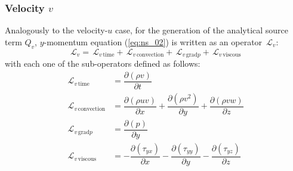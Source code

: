\documentclass[10pt]{article}
\newcommand{\Diff}[2] {\dfrac{\partial( #1)}{\partial #2}}
\newcommand{\Lo}{\,\mathcal{L}}
\newcommand{\convection}{\text{convection}}
\newcommand{\gradp}{\text{grad}p}
\newcommand{\viscous}{\text{viscous}}
\begin{document}
\subsubsection{Velocity $v$}
Analogously to the velocity-$u$ case, for the generation of the analytical source term $Q_v$, $y$-momentum equation (\ref{eq:ns_02}) is written as an operator $\Lo_v$:
 $$\Lo_v = \Lo_{v \, \text{time}}+\Lo_{v \, \convection}+\Lo_{v \, \gradp }+\Lo_{v \, \viscous }$$
with each one of the sub-operators defined as follows:
\begin{equation*}
 \begin{split}
\Lo_{v \, \text{time}}&= \Diff{\rho v}{t} \\
\Lo_{v \, \convection}&= \Diff{\rho uv }{x}+\Diff{\rho v^2}{y} +\Diff{\rho vw}{z}\\
\Lo_{v \, \gradp }&= \Diff{p}{y}\\
\Lo_{v \, \viscous }&= -\Diff{\tau_{yx}}{x}-\Diff{\tau_{yy}}{y}-\Diff{\tau_{yz}}{z}
 \end{split}
\end{equation*}
\end{document}
